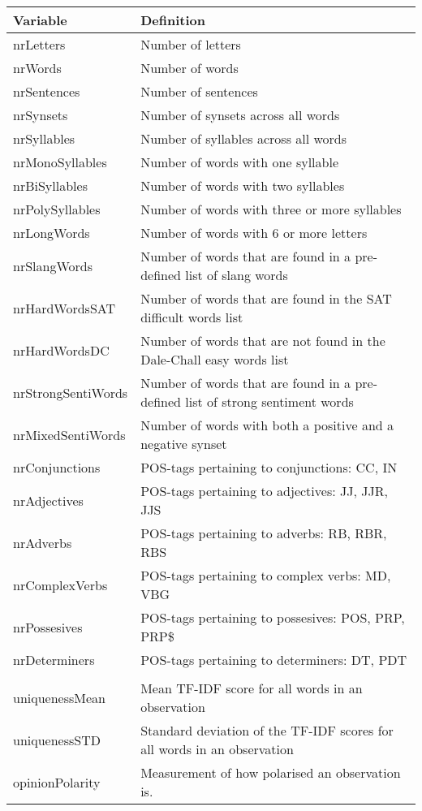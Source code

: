 \begin{tabular}{|l|p{80mm}|} \hline
\textbf{Variable} & \textbf{Definition} \\ \hline
nrLetters & Number of letters \\ \hline
nrWords & Number of words \\ \hline
nrSentences & Number of sentences \\ \hline
nrSynsets & Number of synsets across all words \\ \hline
nrSyllables & Number of syllables across all words \\ \hline
nrMonoSyllables & Number of words with one syllable \\ \hline
nrBiSyllables & Number of words with two syllables \\ \hline
nrPolySyllables & Number of words with three or more syllables \\ \hline
nrLongWords & Number of words with 6 or more letters \\ \hline
nrSlangWords & Number of words that are found in a pre-defined list of slang words \\ \hline
nrHardWordsSAT & Number of words that are found in the SAT difficult words list \\ \hline
nrHardWordsDC & Number of words that are not found in the Dale-Chall easy words list \\ \hline
nrStrongSentiWords & Number of words that are found in a pre-defined list of strong sentiment words \\ \hline
nrMixedSentiWords & Number of words with both a positive and a negative synset \\ \hline
nrConjunctions & POS-tags pertaining to conjunctions: CC, IN \\ \hline
nrAdjectives & POS-tags pertaining to adjectives: JJ, JJR, JJS \\ \hline
nrAdverbs & POS-tags pertaining to adverbs: RB, RBR, RBS \\ \hline
nrComplexVerbs & POS-tags pertaining to complex verbs: MD, VBG \\ \hline
nrPossesives & POS-tags pertaining to possesives: POS, PRP, PRP\$ \\ \hline
nrDeterminers & POS-tags pertaining to determiners: DT, PDT\\ \hline
 \multicolumn{3}{c}{} \\ [-1.5ex] \hline
uniquenessMean & Mean TF-IDF score for all words in an observation \\ \hline
uniquenessSTD & Standard deviation of the TF-IDF scores for all words in an observation \\ \hline
opinionPolarity & Measurement of how polarised an observation is. \\ \hline
\end{tabular}